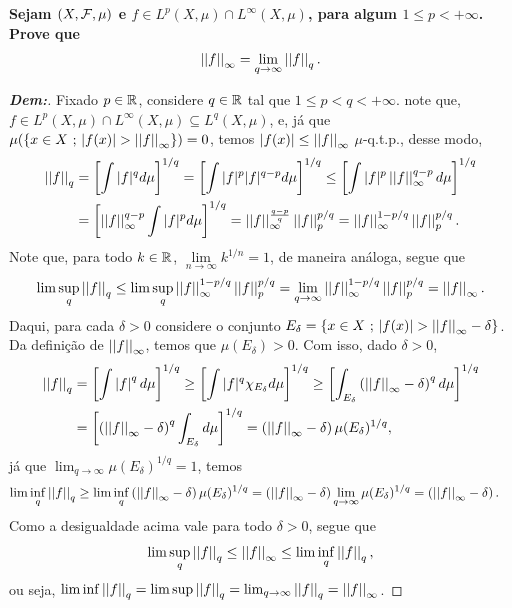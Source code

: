 \textbf{Sejam $(X, \mcal F, \mu)$ e $f \in L^p(X, \mu) \cap L^\infty(X, \mu)$, 
para algum $1 \le p < +\infty$. Prove que 
\begin{align*}
  \pnorm \infty f = \lim_{q \rightarrow \infty} \pnorm q f.
\end{align*}}
\begin{proof}[\textbf{Dem:}] Fixado $p \in \bR$, 
  considere $q \in \bR$ tal que $1\le p < q < +\infty$.
  note que, $f \in L^p(X, \mu) \cap L^\infty(X, \mu) \subseteq L^q(X, \mu)$, e,
  já que $\mu(\set{x \in X \st |f(x)| > \pnorm \infty f}) = 0$, temos 
  $|f(x)| \le \pnorm \infty f$ $\mu$-q.t.p., desse modo,
  \begin{align*}
    \pnorm q f &= \cparth{\int |f|^q d\mu}^{1/q} = 
    \cparth{\int |f|^p|f|^{q-p}d\mu}^{1/q}
    \le \cparth{\int |f|^p \pnorm \infty f^{q-p} d\mu}^{1/q}\\
    &= \cparth{\pnorm \infty f^{q- p} \int |f|^p d\mu}^{1/q} 
    = \pnorm \infty f^{\frac{q-p}{q}} \pnorm p f^{p/q} 
    = \pnorm \infty f^{1 - p/q}\pnorm p f^{p/q}.
  \end{align*}
  Note que, para todo $k \in \bR$, $\lim\limits_{n \rightarrow \infty} k^{1/n} = 1$,
  de maneira análoga, segue que 
  \begin{align*}
    \lim\sup_{q}\pnorm q f 
    \le \lim\sup_{q} \pnorm \infty f^{1 - p/q} \pnorm p f^{p/q}
    =\lim_{q \rightarrow \infty} \pnorm \infty f^{1 - p/q} \pnorm p f^{p/q}
    = \pnorm \infty f. 
  \end{align*}
  Daqui, para cada $\delta > 0$ considere o conjunto 
  $E_{\delta} = \set{x \in X \st |f(x)| > \pnorm \infty f - \delta}$. 
  Da definição de $\pnorm \infty f$, temos que $\mu(E_{\delta})>0$. Com isso,
  dado $\delta > 0$,
  \begin{align*}
    \pnorm q f &= \cparth{\int \mparth f^q d\mu}^{1/q} \ge 
    \cparth{\int |f|^q \chi_{E_\delta}d\mu}^{1/q}
    \ge \cparth{\int_{E_\delta} \parth{\pnorm \infty f - \delta}^qd\mu}^{1/q}\\
    &= \cparth{\parth{\pnorm \infty f - \delta}^q \int_{E_\delta} d\mu}^{1/q}
    =\parth{\pnorm \infty f - \delta}\mu(E_\delta)^{1/q},
  \end{align*}
  já que $\lim_{q \rightarrow \infty} \mu(E_\delta)^{1/q} = 1$, temos 
  \begin{align*}
    \lim\inf_{q} \pnorm q f 
    &\ge \lim\inf_{q} \parth{\pnorm \infty f - \delta} \mu(E_\delta)^{1/q}
    = \parth{\pnorm \infty f - \delta}\lim_{q \rightarrow \infty} \mu(E_\delta)^{1/q}
    = \parth{\pnorm \infty f - \delta}.
  \end{align*}
  Como a desigualdade acima vale para todo $\delta > 0$, segue que 
  \begin{align*}
    \lim \sup_{q} \pnorm q f \le \pnorm \infty f \le \lim \inf_q \pnorm q f,
  \end{align*}
  ou seja,  $\lim \inf \pnorm q f = \lim \sup \pnorm q f 
  = \lim_{q\rightarrow \infty} \pnorm q f = \pnorm \infty f$.
\end{proof}

